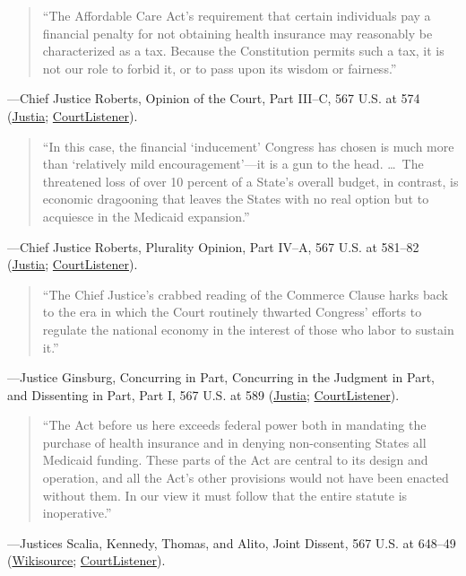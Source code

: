 \documentclass[12pt]{article}
\begin{document}
\begin{quote}
``The Affordable Care Act's requirement that certain individuals pay a financial penalty for not obtaining health insurance may reasonably be characterized as a tax. Because the Constitution permits such a tax, it is not our role to forbid it, or to pass upon its wisdom or fairness.''
\end{quote}
---Chief Justice Roberts, Opinion of the Court, Part III--C, 567 U.S. at 574 (\href{https://supreme.justia.com/cases/federal/us/567/519/}{Justia}; \href{https://www.courtlistener.com/opinion/809122/national-federation-of-independent-business-v-sebelius/}{CourtListener}).

\begin{quote}
``In this case, the financial `inducement' Congress has chosen is much more than `relatively mild encouragement'---it is a gun to the head. \ldots\ The threatened loss of over 10 percent of a State's overall budget, in contrast, is economic dragooning that leaves the States with no real option but to acquiesce in the Medicaid expansion.''
\end{quote}
---Chief Justice Roberts, Plurality Opinion, Part IV--A, 567 U.S. at 581--82 (\href{https://supreme.justia.com/cases/federal/us/567/519/}{Justia}; \href{https://www.courtlistener.com/opinion/809122/national-federation-of-independent-business-v-sebelius/}{CourtListener}).

\begin{quote}
``The Chief Justice's crabbed reading of the Commerce Clause harks back to the era in which the Court routinely thwarted Congress' efforts to regulate the national economy in the interest of those who labor to sustain it.''
\end{quote}
---Justice Ginsburg, Concurring in Part, Concurring in the Judgment in Part, and Dissenting in Part, Part I, 567 U.S. at 589 (\href{https://supreme.justia.com/cases/federal/us/567/519/}{Justia}; \href{https://www.courtlistener.com/opinion/809122/national-federation-of-independent-business-v-sebelius/}{CourtListener}).

\begin{quote}
``The Act before us here exceeds federal power both in mandating the purchase of health insurance and in denying non-consenting States all Medicaid funding. These parts of the Act are central to its design and operation, and all the Act's other provisions would not have been enacted without them. In our view it must follow that the entire statute is inoperative.''
\end{quote}
---Justices Scalia, Kennedy, Thomas, and Alito, Joint Dissent, 567 U.S. at 648--49 (\href{https://en.wikisource.org/wiki/National_Federation_of_Independent_Business_v._Sebelius/Dissent_Scalia,_Kennedy,_Thomas,_and_Alito}{Wikisource}; \href{https://www.courtlistener.com/opinion/809122/national-federation-of-independent-business-v-sebelius/}{CourtListener}).
\end{document}
